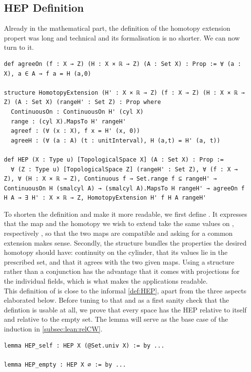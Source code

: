 \documentclass[11pt, a4paper, english]{article}
\theoremstyle{plain}
\theoremstyle{definition}
\theoremstyle{remark}
\numberwithin{equation}{section}
\numberwithin{theorem}{section}
\begin{document}
\subsection{HEP Definition} \label{subsec:lean:definition}
Already in the mathematical part, the definition of the homotopy extension propert was long and technical and its formalisation is no shorter. We can now turn to it.

\begin{verbatim}
def agreeOn (f : X → Z) (H : X × ℝ → Z) (A : Set X) : Prop := ∀ (a : X), a ∈ A → f a = H (a,0)

structure HomotopyExtension (H' : X × ℝ → Z) (f : X → Z) (H : X × ℝ → Z) (A : Set X) (rangeH' : Set Z) : Prop where
  ContinuousOn : ContinuousOn H' (cyl X)
  range : (cyl X).MapsTo H' rangeH'
  agreef : (∀ (x : X), f x = H' (x, 0))
  agreeH : (∀ (a : A) (t : unitInterval), H (a,t) = H' (a, t))

def HEP (X : Type u) [TopologicalSpace X] (A : Set X) : Prop :=
  ∀ (Z : Type u) [TopologicalSpace Z] (rangeH' : Set Z), ∀ (f : X → Z), ∀ (H : X × ℝ → Z), Continuous f → Set.range f ⊆ rangeH' → ContinuousOn H (smalcyl A) → (smalcyl A).MapsTo H rangeH' → agreeOn f H A → ∃ H' : X × ℝ → Z, HomotopyExtension H' f H A rangeH'
\end{verbatim}

To shorten the definition and make it more readable, we first define . It expresses that the map  and the homotopy  we wish to extend take the same values on , respectively , so that the two maps are compatible and asking for a common extension makes sense.
Secondly, the structure  bundles the properties the desired homotopy should have: continuity on the cylinder, that its values lie in the prescribed set, and that it agrees with the two given maps. Using a structure rather than a conjunction has the advantage that it comes with projections for the individual fields, which is what makes the applications readable. \\

This definition of  is close to the informal \cref{def:HEP}, apart from the three aspects elaborated below. Before tuning to that and as a first sanity check that the defintion is usable at all, we prove that every space has the HEP relative to itself and relative to the empty set. The lemma  will serve as the base case of the induction in \cref{subsec:lean:relCW}.
\begin{verbatim}
lemma HEP_self : HEP X (@Set.univ X) := by ...
  
lemma HEP_empty : HEP X ∅ := by ...
\end{verbatim}
\end{document}
